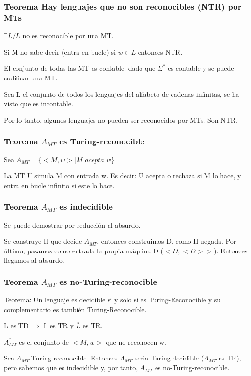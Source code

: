 \subsubsection{Teorema Hay lenguajes que no son reconocibles (NTR) por MTs}
$\exists L / L$ no es reconocible por una MT.

Si M no sabe decir (entra en bucle) si $w \in L$ entonces NTR.

El conjunto de todas las MT es contable, dado que $\Sigma^*$ es contable y se puede codificar una MT.

Sea L el conjunto de todos los lenguajes del alfabeto de cadenas infinitas, se ha visto que es incontable.

Por lo tanto, algunos lenguajes no pueden ser reconocidos por MTs. Son NTR.

\subsubsection{Teorema $A_{MT}$ es Turing-reconocible}
Sea $A_{MT}=\{<M,w> | M \textit{ acepta }w\}$

La MT U simula M con entrada w. Es decir: U acepta o rechaza si M lo hace, y entra en bucle infinito si este lo hace.

\subsubsection{Teorema $A_{MT}$ es indecidible}
Se puede demostrar por reducción al absurdo.

Se construye H que decide $A_{MT}$, entonces construimos D, como H negada. Por último, pasamos como entrada la propia máquina D ($<D, <D>>$). Entonces llegamos al absurdo.

\subsubsection{Teorema $\overline{A_{MT}}$ es no-Turing-reconocible}
Teorema: Un lenguaje es decidible si y solo si es Turing-Reconocible y su complementario es también Turing-Reconocible.

L es TD $\Rightarrow$ L es TR y $\overline{L}$ es TR.

$\overline{A_{MT}}$ es el conjunto de $<M,w>$ que no reconocen w.

Sea $\overline{A_{MT}}$ Turing-reconocible. Entonces $A_{MT}$ seria Turing-decidible ($A_{MT}$ es TR), pero sabemos que es indecidible y, por tanto, $\overline{A_{MT}}$ es no-Turing-reconocible.

